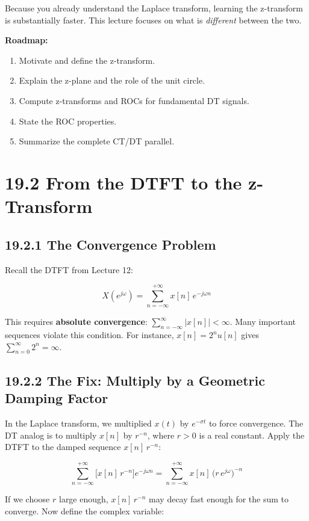 \documentclass[11pt]{article}
\begin{document}
Because you already understand the Laplace transform, learning the z-transform is substantially faster. This lecture focuses on what is \textit{different} between the two.

\textbf{Roadmap:}

\begin{enumerate}
  \item Motivate and define the z-transform.
  \item Explain the z-plane and the role of the unit circle.
  \item Compute z-transforms and ROCs for fundamental DT signals.
  \item State the ROC properties.
  \item Summarize the complete CT/DT parallel.
\end{enumerate}

\section*{19.2 From the DTFT to the z-Transform}

\subsection*{19.2.1 The Convergence Problem}

Recall the DTFT from Lecture 12:

\[X(e^{j\omega}) = \sum_{n=-\infty}^{+\infty} x[n]\, e^{-j\omega n}\]

This requires \textbf{absolute convergence}: $\sum_{n=-\infty}^{\infty} |x[n]| < \infty$. Many important sequences violate this condition. For instance, $x[n] = 2^n u[n]$ gives $\sum_{n=0}^{\infty} 2^n = \infty$.

\subsection*{19.2.2 The Fix: Multiply by a Geometric Damping Factor}

In the Laplace transform, we multiplied $x(t)$ by $e^{-\sigma t}$ to force convergence. The DT analog is to multiply $x[n]$ by $r^{-n}$, where $r > 0$ is a real constant. Apply the DTFT to the damped sequence $x[n]\, r^{-n}$:

\[\sum_{n=-\infty}^{+\infty} \bigl[x[n]\, r^{-n}\bigr] e^{-j\omega n} = \sum_{n=-\infty}^{+\infty} x[n]\, \bigl(r\, e^{j\omega}\bigr)^{-n}\]

If we choose $r$ large enough, $x[n]\, r^{-n}$ may decay fast enough for the sum to converge. Now define the complex variable:
\end{document}
